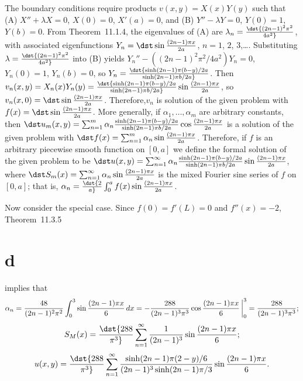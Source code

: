 \documentclass[dvips]{book}
\renewcommand{\exer}[1]{\par\medskip\;\noindent{\color{red}\bf #1.}}
\numberwithin{example}{section}
\numberwithin{equation}{section}
\numberwithin{theorem}{section}
\numberwithin{table}{section}
\numberwithin{figure}{section}
\newcommand{\lims}[2]{\,\bigg|_{#1}^{#2}}
\begin{document}
\exer{12.3.20}
The boundary conditions require products $v(x,y)=X(x)Y(y)$
such that
(A)  $X''+\lambda X=0$, $X(0)=0$, $X'(a)=0$, and
(B)  $Y''-\lambda Y=0$, $Y(0)=1$, $Y(b)=0$.
From Theorem~11.1.4, the eigenvalues of (A) are
$\lambda_n=\dst{(2n-1)^2\pi^2\over4a^2}$, with associated
eigenfunctions
$Y_n=\dst\sin{(2n-1)\pi x\over2a}$, $n=1$, $2$, $3$,\dots.
Substituting $\lambda=\dst{(2n-1)^2\pi^2\over4a^2}$  into (B) yields
$Y_n''-((2n-1)^2\pi^2/4a^2)Y_n=0$, $Y_n(0)=1$, $Y_n(b)=0$, so
$Y_n=\dst{\sinh (2n-1)\pi(b-y)/2a\over\sinh(2n-1) \pi b/2a}$. Then
$v_n(x,y)=X_n(x)Y_n(y)=\dst{\sinh(2n-1)\pi(b-y)/2a\over\sinh(2n-1)\pi
b/2a}\sin{(2n-1)\pi x\over2a}$, so
$v_n(x,0)=\dst\sin{(2n-1)\pi x\over2a}$.
Therefore,$v_n$ is solution of the given problem  with
$f(x)=\dst\sin{(2n-1)\pi x\over2a}$. More generally,
 if $\alpha_1,\dots,\alpha_m$ are arbitrary constants,
then
$\dst
u_m(x,y)=\sum_{n=1}^m\alpha_n{\sinh(2n-1)\pi(b-y)/2a
\over\sinh(2n-1)\pi b/2a}\cos
{(2n-1)\pi x\over2a}$
 is a solution of the given problem with
$\dst f(x)=\sum_{n=1}^m\alpha_n\sin{(2n-1)\pi x\over2a}$.
Therefore, if $f$ is an arbitrary piecewise smooth function on
$[0,a]$  we define the formal solution of the given problem  to be
$\dst
u(x,y)=\sum_{n=1}^\infty\alpha_n{\sinh(2n-1)\pi(b-y)/2a
\over\sinh(2n-1)\pi b/2a}\sin
{(2n-1)\pi x\over2a}$, where
$\dst S_m(x)=\sum_{n=1}^\infty \alpha_n\sin{(2n-1)\pi x\over2a}$
is the mixed Fourier  sine series of $f$ on $[0,a]$; that is,
$\alpha_n=\dst{2\over a}\int_0^a f(x)\sin{(2n-1)\pi x\over2a}$.


Now consider the special case.
Since $f(0)=f'(L)=0$ and $f''(x)=-2$,
Theorem~11.3.5\part{d} implies that
$$
\alpha_n=
{48\over(2n-1)^2\pi^2}\int_0^3\sin{(2n-1)\pi x\over6}\,dx=
-{288\over(2n-1)^3\pi^3}\cos{(2n-1)\pi x\over6}\lims03
={288\over(2n-1)^3\pi^3};
$$
$$
S_M(x)=\dst
{288\over\pi^3}\sum_{n=1}^\infty{1\over
(2n-1)^3}\sin{(2n-1)\pi x\over6};
$$
$$
u(x,y)=\dst
{288\over\pi^3}\sum_{n=1}^\infty{\sinh(2n-1)\pi(2-y)/6\over
(2n-1)^3\sinh(2n-1)\pi/3}\sin{(2n-1)\pi x\over6}.
$$
\end{document}
